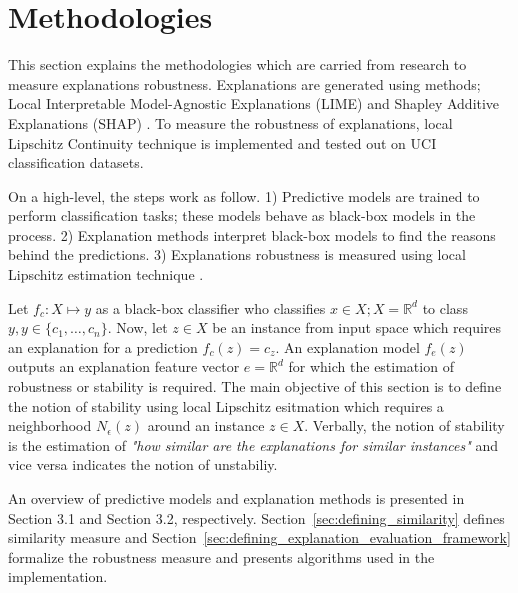\documentclass[english]{tktltiki2}
\theoremstyle{definition}
\theoremstyle{remark}
\begin{document}
\section{Methodologies} %
This section explains the methodologies which are carried from research to measure explanations robustness. Explanations are generated using methods; Local Interpretable Model-Agnostic Explanations (LIME) and Shapley Additive Explanations (SHAP) \citep{ribeiro2016should,lundberg2017unified}. To measure the robustness of explanations, local Lipschitz Continuity technique \citep{alvarez2018robustness} is implemented and tested out on UCI classification datasets.

On a high-level, the steps work as follow. 1) Predictive models are trained to perform classification tasks; these models behave as black-box models in the process. 2) Explanation methods interpret black-box models to find the reasons behind the predictions. 3) Explanations robustness is measured using local Lipschitz estimation technique \citep{alvarez2018robustness}.

Let $f_c: X \mapsto y$ as a black-box classifier who classifies $x \in X; X = {\mathbb{R}}^d$ to class $y, y \in \{c_1, \dots, c_n\}$. Now, let $z \in X$ be an instance from input space which requires an explanation for a prediction $f_c(z) = c_z$. An explanation model $f_e(z)$ outputs an explanation feature vector $ e = {\mathbb{R}}^d$ for which the estimation of robustness or stability is required. The main objective of this section is to define the notion of stability using local Lipschitz esitmation which requires a neighborhood $N_{\epsilon}(z)$ around an instance $z \in X$. Verbally, the notion of stability is the estimation of \textit{"how similar are the explanations for similar instances"} and vice versa indicates the notion of unstabiliy.

An overview of predictive models and explanation methods is presented in Section 3.1 and Section 3.2, respectively. Section~\ref{sec:defining_similarity} defines similarity measure and Section~\ref{sec:defining_explanation_evaluation_framework} formalize the robustness measure and presents algorithms used in the implementation.
\end{document}
